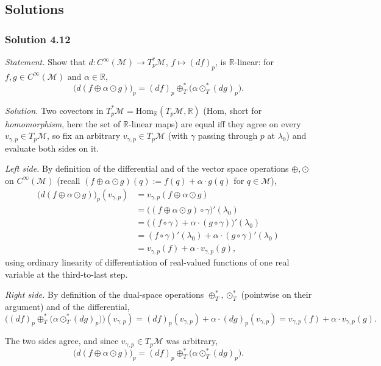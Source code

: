 \documentclass[11pt]{article}
\newcommand{\TpM}{T_p\mathcal M}
\newcommand{\Cinf}{C^\infty(\mathcal M)}
\begin{document}
\subsection*{Solutions}

\subsubsection*{Solution 4.12}

\noindent\textit{Statement.} Show that $d:\Cinf\to T_p^*\mathcal M$,
$f\mapsto(df)_p$, is $\mathbb R$-linear: for $f,g\in\Cinf$ and
$\alpha\in\mathbb R$,
\[
\big(d(f\oplus\alpha\odot g)\big)_p = (df)_p\oplus_T^*\big(\alpha\odot_T^*
(dg)_p\big).
\]

\medskip
\noindent\textit{Solution.} Two covectors in $T_p^*\mathcal
M=\mathrm{Hom}_{\mathbb R}(\TpM,\mathbb R)$ ($\mathrm{Hom}$, short for
\emph{homomorphism}, here the set of $\mathbb R$-linear maps) are equal iff
they agree on every $v_{\gamma,p}\in\TpM$, so fix an arbitrary
$v_{\gamma,p}\in\TpM$ (with $\gamma$ passing through $p$ at $\lambda_0$)
and evaluate both sides on it.

\emph{Left side.} By definition of the differential and of the vector
space operations $\oplus,\odot$ on $\Cinf$ (recall
$(f\oplus\alpha\odot g)(q):=f(q)+\alpha\cdot g(q)$ for $q\in\mathcal M$),
\begin{align*}
\big(d(f\oplus\alpha\odot g)\big)_p(v_{\gamma,p})
&= v_{\gamma,p}(f\oplus\alpha\odot g) \\
&= \big((f\oplus\alpha\odot g)\circ\gamma\big)'(\lambda_0) \\
&= \big((f\circ\gamma) + \alpha\cdot(g\circ\gamma)\big)'(\lambda_0) \\
&= (f\circ\gamma)'(\lambda_0) + \alpha\cdot(g\circ\gamma)'(\lambda_0) \\
&= v_{\gamma,p}(f) + \alpha\cdot v_{\gamma,p}(g),
\end{align*}
using ordinary linearity of differentiation of real-valued functions of
one real variable at the third-to-last step.

\emph{Right side.} By definition of the dual-space operations
$\oplus_T^*,\odot_T^*$ (pointwise on their argument) and of the
differential,
\[
\Big((df)_p\oplus_T^*\big(\alpha\odot_T^*(dg)_p\big)\Big)(v_{\gamma,p}) =
(df)_p(v_{\gamma,p}) + \alpha\cdot(dg)_p(v_{\gamma,p}) = v_{\gamma,p}(f) +
\alpha\cdot v_{\gamma,p}(g).
\]

The two sides agree, and since $v_{\gamma,p}\in\TpM$ was arbitrary,
\[
\big(d(f\oplus\alpha\odot g)\big)_p = (df)_p\oplus_T^*\big(\alpha\odot_T^*
(dg)_p\big).
\]
\end{document}
